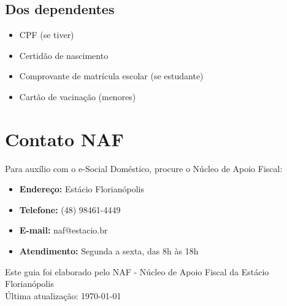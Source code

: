 \documentclass[12pt,a4paper]{article}
\begin{document}
\subsection{Dos dependentes}
\begin{itemize}
    \item CPF (se tiver)
    \item Certidão de nascimento
    \item Comprovante de matrícula escolar (se estudante)
    \item Cartão de vacinação (menores)
\end{itemize}

\section{Contato NAF}

Para auxílio com o e-Social Doméstico, procure o Núcleo de Apoio Fiscal:

\begin{itemize}
    \item \textbf{Endereço:} Estácio Florianópolis
    \item \textbf{Telefone:} (48) 98461-4449
    \item \textbf{E-mail:} naf@estacio.br
    \item \textbf{Atendimento:} Segunda a sexta, das 8h às 18h
\end{itemize}

\vfill
\begin{center}
\footnotesize
Este guia foi elaborado pelo NAF - Núcleo de Apoio Fiscal da Estácio Florianópolis\\
Última atualização: \today
\end{center}
\end{document}

